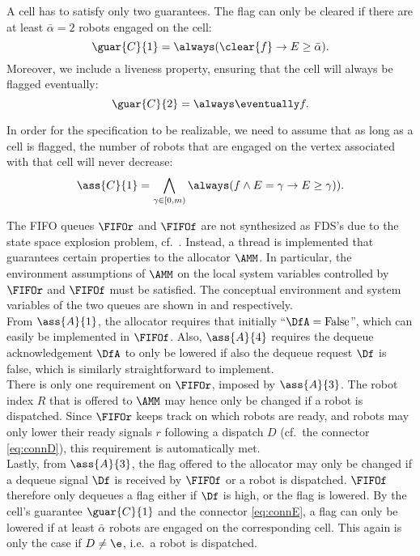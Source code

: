 A cell has to satisfy only two guarantees. The flag can only be cleared if there are at least $\bar{\alpha} = 2$ robots engaged on the cell:
\begin{equation*}
	\guar{C}{1} = \always(\clear{f} \rightarrow E \geq \bar{\alpha}).
\end{equation*}
Moreover, we include a liveness property, ensuring that the cell will always be flagged eventually:
\begin{equation*}
	\guar{C}{2} = \always\eventually f.
\end{equation*}

In order for the specification to be realizable, we need to assume that as long as a cell is flagged, the number of robots that are engaged on the vertex associated with that cell will never decrease:
\begin{equation*}
	\ass{C}{1} = \bigwedge_{\gamma \in [0, m)}\always(f \wedge E=\gamma \rightarrow \next(E\geq\gamma)).
\end{equation*}

The FIFO queues $\FIFOr$ and $\FIFOf$ are not synthesized as FDS's due to the state space explosion problem, cf.\ . Instead, a thread is implemented that guarantees certain properties to the allocator $\AMM$. In particular, the environment assumptions of $\AMM$ on the local system variables controlled by $\FIFOr$ and $\FIFOf$ must be satisfied. The conceptual environment and system variables of the two queues are shown in  and  respectively.\\

From $\ass{A}{1}$, the allocator requires that initially ``$\DfA = \mathrm{False}$'', which can easily be implemented in $\FIFOf$. Also, $\ass{A}{4}$ requires the dequeue acknowledgement $\DfA$ to only be lowered if also the dequeue request $\Df$ is false, which is similarly straightforward to implement.\\

There is only one requirement on $\FIFOr$, imposed by $\ass{A}{3}$. The robot index $R$ that is offered to $\AMM$ may hence only be changed if a robot is dispatched. Since $\FIFOr$ keeps track on which robots are ready, and robots may only lower their ready signals $r$ following a dispatch $D$ (cf.\ the connector \eqref{eq:connD}), this requirement is automatically met.\\

Lastly, from $\ass{A}{3}$, the flag offered to the allocator may only be changed if a dequeue signal $\Df$ is received by $\FIFOf$ or a robot is dispatched. $\FIFOf$ therefore only dequeues a flag either if $\Df$ is high, or the flag is lowered. By the cell's guarantee $\guar{C}{1}$ and the connector \eqref{eq:connE}, a flag can only be lowered if at least $\bar{\alpha}$ robots are engaged on the corresponding cell. This again is only the case if $D \neq \e$, i.e.\ a robot is dispatched.\\



